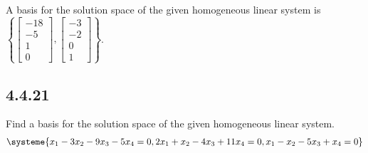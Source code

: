 \documentclass{article}
\begin{document}
\begin{mdframed}
	A basis for the solution space of the given homogeneous linear system is $ \left\{ \begin{bmatrix} -18 \\ -5 \\ 1 \\ 0 \end{bmatrix}, \begin{bmatrix} -3 \\ -2 \\ 0 \\ 1 \end{bmatrix} \right\} $.
\end{mdframed}

\subsection{4.4.21}

Find a basis for the solution space of the given homogeneous linear system.
\begin{align*}
	\systeme{
		x_1 - 3x_2 - 9x_3 - 5x_4 = 0,
		2x_1 + x_2 - 4x_3 + 11x_4 = 0,
		x_1 - x_2 - 5x_3 + x_4 = 0
	}
\end{align*}
\end{document}
